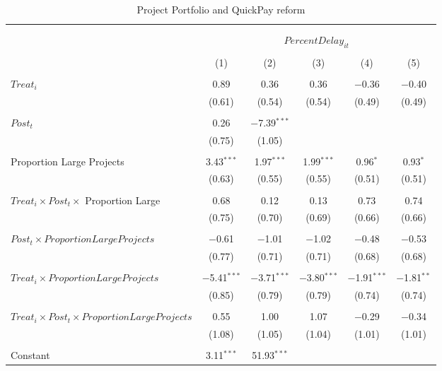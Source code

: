 \documentclass[
]{article}
\begin{document}
\begin{table}[H] \centering 
  \caption{Project Portfolio and QuickPay reform} 
  \label{} 
\small 
\begin{tabular}{@{\extracolsep{-2pt}}lccccc} 
\\[-1.8ex]\hline 
\hline \\[-1.8ex] 
\\[-1.8ex] & \multicolumn{5}{c}{$PercentDelay_{it}$  } \\ 
\\[-1.8ex] & (1) & (2) & (3) & (4) & (5)\\ 
\hline \\[-1.8ex] 
 $Treat_i$ & 0.89 & 0.36 & 0.36 & $-$0.36 & $-$0.40 \\ 
  & (0.61) & (0.54) & (0.54) & (0.49) & (0.49) \\ 
  & & & & & \\ 
 $Post_t$ & 0.26 & $-$7.39$^{***}$ &  &  &  \\ 
  & (0.75) & (1.05) &  &  &  \\ 
  & & & & & \\ 
 Proportion Large Projects & 3.43$^{***}$ & 1.97$^{***}$ & 1.99$^{***}$ & 0.96$^{*}$ & 0.93$^{*}$ \\ 
  & (0.63) & (0.55) & (0.55) & (0.51) & (0.51) \\ 
  & & & & & \\ 
 $Treat_i \times Post_t \times$ Proportion Large & 0.68 & 0.12 & 0.13 & 0.73 & 0.74 \\ 
  & (0.75) & (0.70) & (0.69) & (0.66) & (0.66) \\ 
  & & & & & \\ 
 $Post_t \times Proportion Large Projects$ & $-$0.61 & $-$1.01 & $-$1.02 & $-$0.48 & $-$0.53 \\ 
  & (0.77) & (0.71) & (0.71) & (0.68) & (0.68) \\ 
  & & & & & \\ 
 $Treat_i \times Proportion Large Projects$ & $-$5.41$^{***}$ & $-$3.71$^{***}$ & $-$3.80$^{***}$ & $-$1.91$^{***}$ & $-$1.81$^{**}$ \\ 
  & (0.85) & (0.79) & (0.79) & (0.74) & (0.74) \\ 
  & & & & & \\ 
 $Treat_i \times Post_t \times Proportion Large Projects$ & 0.55 & 1.00 & 1.07 & $-$0.29 & $-$0.34 \\ 
  & (1.08) & (1.05) & (1.04) & (1.01) & (1.01) \\ 
  & & & & & \\ 
 Constant & 3.11$^{***}$ & 51.93$^{***}$ &  &  &  \\ 

\end{tabular}
\end{table}
\end{document}

